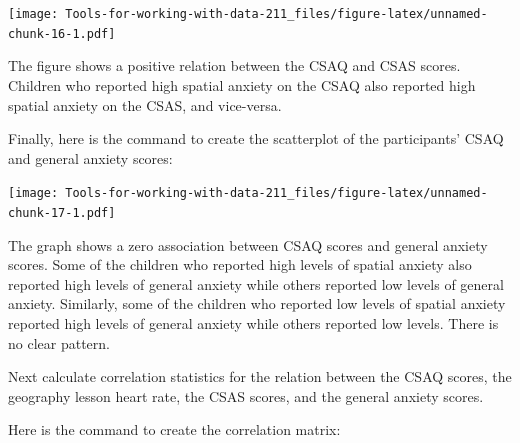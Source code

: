 \documentclass[
]{book}
\newenvironment{Shaded}{\begin{snugshade}}{\end{snugshade}}
\newcommand{\DataTypeTok}[1]{\textcolor[rgb]{0.13,0.29,0.53}{#1}}
\newcommand{\KeywordTok}[1]{\textcolor[rgb]{0.13,0.29,0.53}{\textbf{#1}}}
\newcommand{\NormalTok}[1]{#1}
\newcommand{\OperatorTok}[1]{\textcolor[rgb]{0.81,0.36,0.00}{\textbf{#1}}}
\newcommand{\OtherTok}[1]{\textcolor[rgb]{0.56,0.35,0.01}{#1}}
\newcommand{\StringTok}[1]{\textcolor[rgb]{0.31,0.60,0.02}{#1}}
\begin{document}
\begin{Shaded}
\end{Shaded}

\texttt{[image: Tools-for-working-with-data-211\_files/figure-latex/unnamed-chunk-16-1.pdf]}

The figure shows a positive relation between the CSAQ and CSAS scores. Children who reported high spatial anxiety on the CSAQ also reported high spatial anxiety on the CSAS, and vice-versa.

Finally, here is the command to create the scatterplot of the participants' CSAQ and general anxiety scores:

\begin{Shaded}
\end{Shaded}

\texttt{[image: Tools-for-working-with-data-211\_files/figure-latex/unnamed-chunk-17-1.pdf]}

The graph shows a zero association between CSAQ scores and general anxiety scores. Some of the children who reported high levels of spatial anxiety also reported high levels of general anxiety while others reported low levels of general anxiety. Similarly, some of the children who reported low levels of spatial anxiety reported high levels of general anxiety while others reported low levels. There is no clear pattern.

Next calculate correlation statistics for the relation between the CSAQ scores, the geography lesson heart rate, the CSAS scores, and the general anxiety scores.

Here is the command to create the correlation matrix:

\begin{Shaded}
\end{Shaded}
\end{document}
